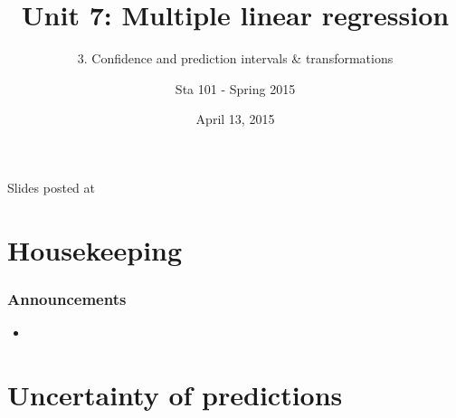 \documentclass[slidestop,compress,mathserif,12pt,t,professionalfonts,xcolor=table]{beamer}
\title{Unit 7: Multiple linear regression}
\subtitle{3. Confidence and prediction intervals \& transformations}
\author{Sta 101 - Spring 2015}
\date{April 13, 2015}
\institute{Duke University, Department of Statistical Science}
\begin{document}


\begin{frame}[plain]

\titlepage
\vfill
{\scriptsize {} \hfill Slides posted at  \webLink{\CourseSite}{\CourseSite}}
\addtocounter{framenumber}{-1} 

\end{frame}


\section{Housekeeping}


\begin{frame}
\frametitle{Announcements}

\begin{itemize}

\item 

\end{itemize}

\end{frame}


\section{Uncertainty of predictions}

\end{document}
